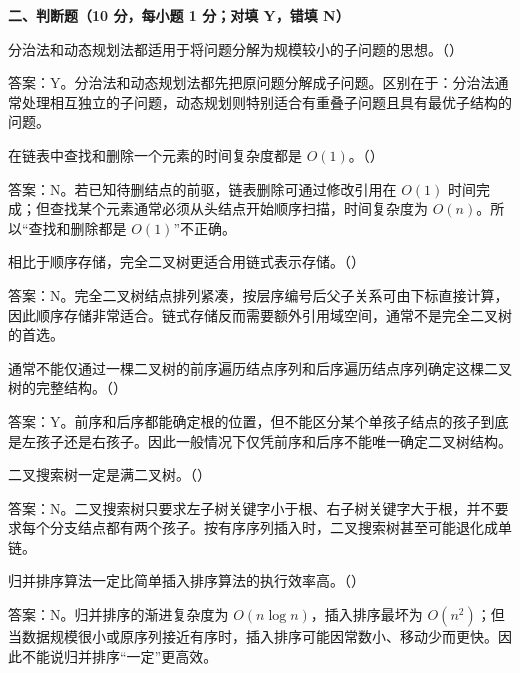 \textbf{二、判断题（10 分，每小题 1 分；对填 Y，错填 N）}

\begin{question}
分治法和动态规划法都适用于将问题分解为规模较小的子问题的思想。（\quad）
\begin{solution}
答案：Y。分治法和动态规划法都先把原问题分解成子问题。区别在于：分治法通常处理相互独立的子问题，动态规划则特别适合有重叠子问题且具有最优子结构的问题。
\end{solution}
\end{question}

\begin{question}
在链表中查找和删除一个元素的时间复杂度都是 $O(1)$。（\quad）
\begin{solution}
答案：N。若已知待删结点的前驱，链表删除可通过修改引用在 $O(1)$ 时间完成；但查找某个元素通常必须从头结点开始顺序扫描，时间复杂度为 $O(n)$。所以“查找和删除都是 $O(1)$”不正确。
\end{solution}
\end{question}

\begin{question}
相比于顺序存储，完全二叉树更适合用链式表示存储。（\quad）
\begin{solution}
答案：N。完全二叉树结点排列紧凑，按层序编号后父子关系可由下标直接计算，因此顺序存储非常适合。链式存储反而需要额外引用域空间，通常不是完全二叉树的首选。
\end{solution}
\end{question}

\begin{question}
通常不能仅通过一棵二叉树的前序遍历结点序列和后序遍历结点序列确定这棵二叉树的完整结构。（\quad）
\begin{solution}
答案：Y。前序和后序都能确定根的位置，但不能区分某个单孩子结点的孩子到底是左孩子还是右孩子。因此一般情况下仅凭前序和后序不能唯一确定二叉树结构。
\end{solution}
\end{question}

\begin{question}
二叉搜索树一定是满二叉树。（\quad）
\begin{solution}
答案：N。二叉搜索树只要求左子树关键字小于根、右子树关键字大于根，并不要求每个分支结点都有两个孩子。按有序序列插入时，二叉搜索树甚至可能退化成单链。
\end{solution}
\end{question}

\begin{question}
归并排序算法一定比简单插入排序算法的执行效率高。（\quad）
\begin{solution}
答案：N。归并排序的渐进复杂度为 $O(n\log n)$，插入排序最坏为 $O(n^2)$；但当数据规模很小或原序列接近有序时，插入排序可能因常数小、移动少而更快。因此不能说归并排序“一定”更高效。
\end{solution}
\end{question}


